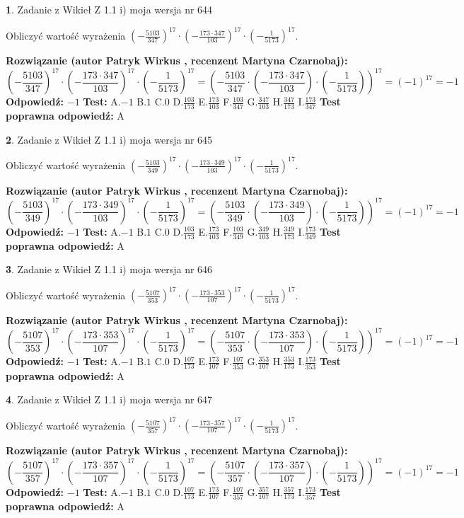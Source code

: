 \documentclass[12pt, a4paper]{article}
\theoremstyle{definition} %
\newtheorem{zad}{}
\newcommand{\zadStart}[1]{\begin{zad}#1\newline}
\newcommand{\zadStop}{\end{zad}}
\newcommand{\rozwStart}[2]{\noindent \textbf{Rozwiązanie (autor #1 , recenzent #2): }\newline}
\newcommand{\rozwStop}{\newline}
\newcommand{\odpStart}{\noindent \textbf{Odpowiedź:}\newline}
\newcommand{\odpStop}{\newline}
\newcommand{\testStart}{\noindent \textbf{Test:}\newline}
\newcommand{\testStop}{\newline}
\newcommand{\kluczStart}{\noindent \textbf{Test poprawna odpowiedź:}\newline}
\newcommand{\kluczStop}{\newline}
\begin{document}
\zadStart{Zadanie z Wikieł Z 1.1 i) moja wersja nr 644}

Obliczyć wartość wyrażenia $(-\frac{5103}{347})^{17} \cdot (-\frac{173 \cdot 347}{103})^{17} \cdot (-\frac{1}{5173})^{17}$.
\zadStop
\rozwStart{Patryk Wirkus}{Martyna Czarnobaj}
$$(-\frac{5103}{347})^{17} \cdot (-\frac{173 \cdot 347}{103})^{17} \cdot (-\frac{1}{5173})^{17} = (-\frac{5103}{347} \cdot (-\frac{173 \cdot 347}{103}) \cdot (-\frac{1}{5173}))^{17} = (-1)^{17} = -1$$
\rozwStop
\odpStart
$-1$
\odpStop
\testStart
A.$-1$ B.$1$ C.$0$ D.$\frac{103}{173}$ E.$\frac{173}{103}$
F.$\frac{103}{347}$ G.$\frac{347}{103}$
H.$\frac{347}{173}$
I.$\frac{173}{347}$
\testStop
\kluczStart
A
\kluczStop



\zadStart{Zadanie z Wikieł Z 1.1 i) moja wersja nr 645}

Obliczyć wartość wyrażenia $(-\frac{5103}{349})^{17} \cdot (-\frac{173 \cdot 349}{103})^{17} \cdot (-\frac{1}{5173})^{17}$.
\zadStop
\rozwStart{Patryk Wirkus}{Martyna Czarnobaj}
$$(-\frac{5103}{349})^{17} \cdot (-\frac{173 \cdot 349}{103})^{17} \cdot (-\frac{1}{5173})^{17} = (-\frac{5103}{349} \cdot (-\frac{173 \cdot 349}{103}) \cdot (-\frac{1}{5173}))^{17} = (-1)^{17} = -1$$
\rozwStop
\odpStart
$-1$
\odpStop
\testStart
A.$-1$ B.$1$ C.$0$ D.$\frac{103}{173}$ E.$\frac{173}{103}$
F.$\frac{103}{349}$ G.$\frac{349}{103}$
H.$\frac{349}{173}$
I.$\frac{173}{349}$
\testStop
\kluczStart
A
\kluczStop



\zadStart{Zadanie z Wikieł Z 1.1 i) moja wersja nr 646}

Obliczyć wartość wyrażenia $(-\frac{5107}{353})^{17} \cdot (-\frac{173 \cdot 353}{107})^{17} \cdot (-\frac{1}{5173})^{17}$.
\zadStop
\rozwStart{Patryk Wirkus}{Martyna Czarnobaj}
$$(-\frac{5107}{353})^{17} \cdot (-\frac{173 \cdot 353}{107})^{17} \cdot (-\frac{1}{5173})^{17} = (-\frac{5107}{353} \cdot (-\frac{173 \cdot 353}{107}) \cdot (-\frac{1}{5173}))^{17} = (-1)^{17} = -1$$
\rozwStop
\odpStart
$-1$
\odpStop
\testStart
A.$-1$ B.$1$ C.$0$ D.$\frac{107}{173}$ E.$\frac{173}{107}$
F.$\frac{107}{353}$ G.$\frac{353}{107}$
H.$\frac{353}{173}$
I.$\frac{173}{353}$
\testStop
\kluczStart
A
\kluczStop



\zadStart{Zadanie z Wikieł Z 1.1 i) moja wersja nr 647}

Obliczyć wartość wyrażenia $(-\frac{5107}{357})^{17} \cdot (-\frac{173 \cdot 357}{107})^{17} \cdot (-\frac{1}{5173})^{17}$.
\zadStop
\rozwStart{Patryk Wirkus}{Martyna Czarnobaj}
$$(-\frac{5107}{357})^{17} \cdot (-\frac{173 \cdot 357}{107})^{17} \cdot (-\frac{1}{5173})^{17} = (-\frac{5107}{357} \cdot (-\frac{173 \cdot 357}{107}) \cdot (-\frac{1}{5173}))^{17} = (-1)^{17} = -1$$
\rozwStop
\odpStart
$-1$
\odpStop
\testStart
A.$-1$ B.$1$ C.$0$ D.$\frac{107}{173}$ E.$\frac{173}{107}$
F.$\frac{107}{357}$ G.$\frac{357}{107}$
H.$\frac{357}{173}$
I.$\frac{173}{357}$
\testStop
\kluczStart
A
\kluczStop
\end{document}
